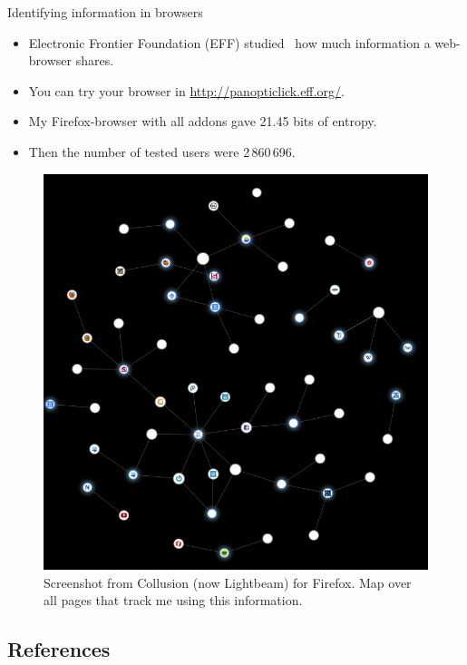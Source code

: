 \documentclass{beamer}
\begin{document}
\begin{frame}
  \begin{block}{Identifying information in browsers}
    \begin{itemize}
      \item Electronic Frontier Foundation (EFF) studied~\cite{Eckersley2010hui} 
        how much information a web-browser shares.

      \item You can try your browser in \url{http://panopticlick.eff.org/}.
    \end{itemize}
  \end{block}

  \pause{}

  \begin{example}[My browser]
    \begin{itemize}
      \item My Firefox-browser with all addons gave 21.45 bits of entropy.

      \item Then the number of tested users were 2\,860\,696.
    \end{itemize}
  \end{example}
\end{frame}

\begin{frame}
  \begin{figure}
    \includegraphics[height=0.7\textheight]{collusion.png}
    \caption{Screenshot from Collusion (now Lightbeam) for Firefox.
      Map over all pages that track me using this information.}
  \end{figure}
\end{frame}



\subsection*{References}
\begin{frame}[allowframebreaks]
	\small
  \printbibliography{}
\end{frame}
\end{document}
